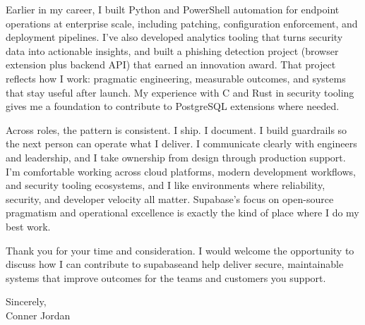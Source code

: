 \documentclass[letterpaper,11pt]{article}
\newcommand{\companyname}{supabase}
\begin{document}
\vspace{16pt}

Earlier in my career, I built Python and PowerShell automation for endpoint operations at enterprise scale, including patching, configuration enforcement, and deployment pipelines. I’ve also developed analytics tooling that turns security data into actionable insights, and built a phishing detection project (browser extension plus backend API) that earned an innovation award. That project reflects how I work: pragmatic engineering, measurable outcomes, and systems that stay useful after launch. My experience with C and Rust in security tooling gives me a foundation to contribute to PostgreSQL extensions where needed.

\vspace{16pt}

Across roles, the pattern is consistent. I ship. I document. I build guardrails so the next person can operate what I deliver. I communicate clearly with engineers and leadership, and I take ownership from design through production support. I’m comfortable working across cloud platforms, modern development workflows, and security tooling ecosystems, and I like environments where reliability, security, and developer velocity all matter. Supabase’s focus on open-source pragmatism and operational excellence is exactly the kind of place where I do my best work.

\vspace{16pt}

Thank you for your time and consideration. I would welcome the opportunity to discuss how I can contribute to \companyname and help deliver secure, maintainable systems that improve outcomes for the teams and customers you support.

\vspace{16pt}

Sincerely,\\
Conner Jordan
\end{document}
